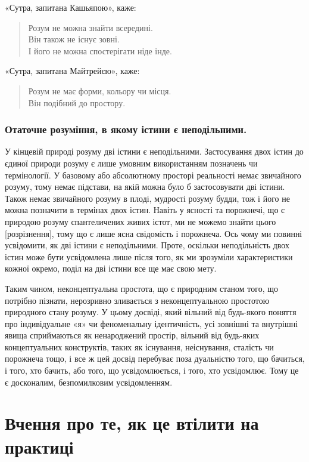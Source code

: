 \documentclass{article}
\begin{document}
«Сутра, запитана Кашьяпою», каже:

\begin{verse}
        Розум не можна знайти всередині. \\
        Він також не існує зовні. \\
        І його не можна спостерігати ніде інде.
\end{verse}

«Сутра, запитана Майтрейєю», каже:

\begin{verse}
        Розум не має форми, кольору чи місця. \\
        Він подібний до простору.
\end{verse}

\subsubsection{Отаточне розуміння, в якому істини є неподільними.}

У кінцевій природі розуму дві істини є неподільними. Застосування двох істин до єдиної природи розуму є лише умовним використанням позначень чи термінології. У базовому або абсолютному просторі реальності немає звичайного розуму, тому немає підстави, на якій можна було б застосовувати дві істини. Також немає звичайного розуму в плоді, мудрості розуму будди, тож і його не можна позначити в термінах двох істин. Навіть у ясності та порожнечі, що є природою розуму спантеличених живих істот, ми не можемо знайти цього [розрізнення], тому що є лише ясна свідомість і порожнеча. Ось чому ми повинні усвідомити, як дві істини є неподільними.
Проте, оскільки неподільність двох істин може бути усвідомлена лише після того, як ми зрозуміли характеристики кожної окремо, поділ на дві істини все ще має свою мету.

Таким чином, неконцептуальна простота, що є природним станом того, що потрібно пізнати, нерозривно зливається з неконцептуальною простотою природного стану розуму. У цьому досвіді, який вільний від будь-якого поняття про індивідуальне «я» чи феноменальну ідентичність, усі зовнішні та внутрішні явища сприймаються як ненароджений простір, вільний від будь-яких концептуальних конструктів, таких як існування, неіснування, сталість чи порожнеча тощо, і все ж цей досвід перебуває поза дуальністю того, що бачиться, і того, хто бачить, або того, що усвідомлюється, і того, хто усвідомлює. Тому це є досконалим, безпомилковим усвідомленням.

\section{Вчення про те, як це втілити на практиці}
\end{document}
